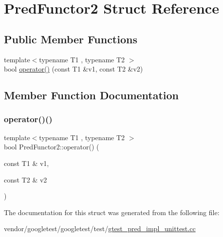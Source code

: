 \hypertarget{struct_pred_functor2}{}\section{Pred\+Functor2 Struct Reference}
\label{struct_pred_functor2}
\subsection*{Public Member Functions}
\begin{DoxyCompactItemize}
\item 
{\footnotesize template$<$typename T1 , typename T2 $>$ }\\bool \hyperlink{struct_pred_functor2_a2142c86e4c0a3139e167dd3f13eb7f6f}{operator()} (const T1 \&v1, const T2 \&v2)
\end{DoxyCompactItemize}


\subsection{Member Function Documentation}
\mbox{\label{struct_pred_functor2_a2142c86e4c0a3139e167dd3f13eb7f6f}} 
\subsubsection{\texorpdfstring{operator()()}{operator()()}}
{\footnotesize\ttfamily template$<$typename T1 , typename T2 $>$ \\
bool Pred\+Functor2\+::operator() (\begin{DoxyParamCaption}\item[{const T1 \&}]{v1,  }\item[{const T2 \&}]{v2 }\end{DoxyParamCaption})\hspace{0.3cm}{\ttfamily [inline]}}



The documentation for this struct was generated from the following file\+:\begin{DoxyCompactItemize}
\item 
vendor/googletest/googletest/test/\hyperlink{gtest__pred__impl__unittest_8cc}{gtest\+\_\+pred\+\_\+impl\+\_\+unittest.\+cc}\end{DoxyCompactItemize}
